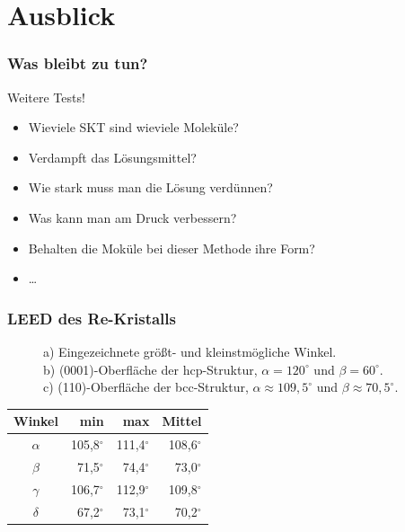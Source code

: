 \documentclass{beamer}
\begin{document}
\section*{Ausblick}

\begin{frame}
\frametitle<presentation>{Was bleibt zu tun?}
Weitere Tests!
\vspace{0.5cm}
\begin{itemize}\setlength{\itemsep}{+15pt}
  \item Wieviele SKT sind wieviele Moleküle?
  \item Verdampft das Lösungsmittel?
  \item Wie stark muss man die Lösung verdünnen?
  \item Was kann man am Druck verbessern?
  \item Behalten die Moküle bei dieser Methode ihre Form?
  \item \ldots
  
\end{itemize}
\end{frame}

\begin{frame}
\frametitle{LEED des Re-Kristalls}
\vspace{-0.2cm}
\begin{figure}[H]
\begin{minipage}[b]{0.45\textwidth}

\end{minipage}
\begin{minipage}[b]{0.45\textwidth}

\end{minipage}
\caption*{a) Eingezeichnete größt- und
kleinstmögliche Winkel.\\ b) (0001)-Oberfläche der hcp-Struktur, $\alpha=120^{\circ}$ und
$\beta=60^{\circ}$.\\ c) (110)-Oberfläche der bcc-Struktur, $\alpha\approx109{,}5^{\circ}$ und
$\beta\approx70{,}5^{\circ}$.}
\end{figure}
\vspace{-0.5cm}
\small\begin{table}[H]
\centering
\begin{tabular}{ c  r  r  r}
Winkel &	min	 &	max & Mittel \\
 \hline                       
 $\alpha$&105,8$^{\circ}$&111,4$^{\circ}$&108,6$^{\circ}$\\
 $\beta$&71,5$^{\circ}$&74,4$^{\circ}$&73,0$^{\circ}$\\
 $\gamma$&106,7$^{\circ}$&112,9$^{\circ}$&109,8$^{\circ}$\\
 $\delta$&67,2$^{\circ}$&73,1$^{\circ}$&70,2$^{\circ}$\\
\end{tabular}
\end{table}
\end{frame}
\end{document}
